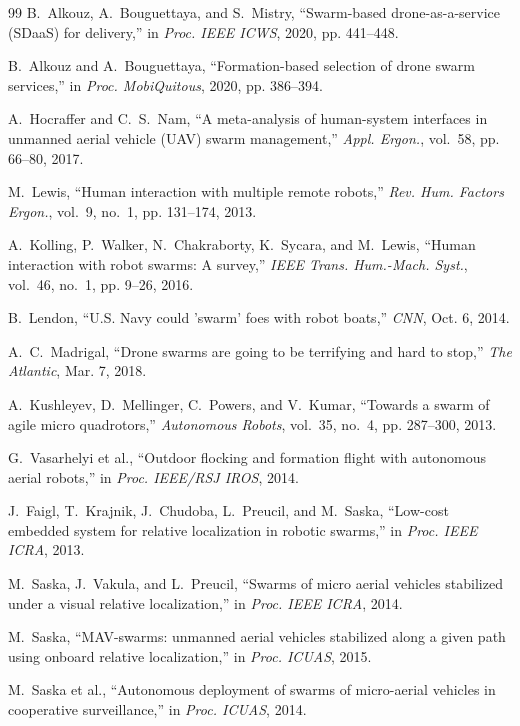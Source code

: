\documentclass[letterpaper, 10pt, conference]{IEEEtran}
\begin{document}
\begin{thebibliography}{99}
B.~Alkouz, A.~Bouguettaya, and S.~Mistry, ``Swarm-based drone-as-a-service ({SDaaS}) for delivery,'' in \emph{Proc. IEEE ICWS}, 2020, pp. 441--448.

B.~Alkouz and A.~Bouguettaya, ``Formation-based selection of drone swarm services,'' in \emph{Proc. MobiQuitous}, 2020, pp. 386--394.

A.~Hocraffer and C.~S.~Nam, ``A meta-analysis of human-system interfaces in unmanned aerial vehicle ({UAV}) swarm management,'' \emph{Appl. Ergon.}, vol.~58, pp. 66--80, 2017.

M.~Lewis, ``Human interaction with multiple remote robots,'' \emph{Rev. Hum. Factors Ergon.}, vol.~9, no.~1, pp. 131--174, 2013.

A.~Kolling, P.~Walker, N.~Chakraborty, K.~Sycara, and M.~Lewis, ``Human interaction with robot swarms: A survey,'' \emph{IEEE Trans. Hum.-Mach. Syst.}, vol.~46, no.~1, pp. 9--26, 2016.

B.~Lendon, ``{U.S.} Navy could 'swarm' foes with robot boats,'' \emph{CNN}, Oct. 6, 2014.

A.~C.~Madrigal, ``Drone swarms are going to be terrifying and hard to stop,'' \emph{The Atlantic}, Mar. 7, 2018.

A.~Kushleyev, D.~Mellinger, C.~Powers, and V.~Kumar, ``Towards a swarm of agile micro quadrotors,'' \emph{Autonomous Robots}, vol.~35, no.~4, pp. 287--300, 2013.

G.~Vasarhelyi et al., ``Outdoor flocking and formation flight with autonomous aerial robots,'' in \emph{Proc. IEEE/RSJ IROS}, 2014.

J.~Faigl, T.~Krajnik, J.~Chudoba, L.~Preucil, and M.~Saska, ``Low-cost embedded system for relative localization in robotic swarms,'' in \emph{Proc. IEEE ICRA}, 2013.

M.~Saska, J.~Vakula, and L.~Preucil, ``Swarms of micro aerial vehicles stabilized under a visual relative localization,'' in \emph{Proc. IEEE ICRA}, 2014.

M.~Saska, ``{MAV}-swarms: unmanned aerial vehicles stabilized along a given path using onboard relative localization,'' in \emph{Proc. ICUAS}, 2015.

M.~Saska et al., ``Autonomous deployment of swarms of micro-aerial vehicles in cooperative surveillance,'' in \emph{Proc. ICUAS}, 2014.


\end{thebibliography}
\end{document}
